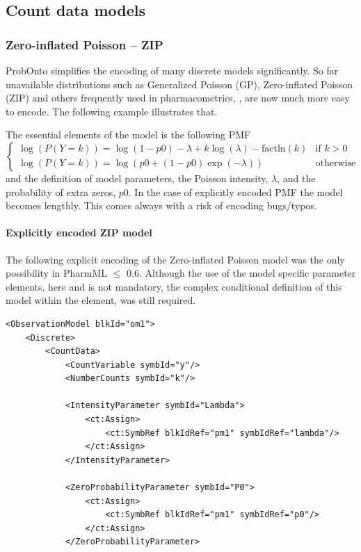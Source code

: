 {\subsection{Count data models}

\subsubsection{Zero-inflated Poisson -- ZIP}
ProbOnto simplifies the encoding of many discrete models significantly. 
So far unavailable distributions such as Generalized Poisson (GP), 
Zero-inflated Poisson (ZIP) and others frequently used in pharmacometrics,
\cite{Plan:2009fk, Troconiz:2009fv}, are now much more easy to encode. The following example illustrates that.

The essential elements of the model is the following PMF
\[
\begin{cases}
  \log(P(Y=k)) = \log(1-p0) - \lambda + k\log(\lambda) - \text{factln}(k) 	& \text{if } k > 0 \\
  \log(P(Y=k)) = \log(p0 + (1-p0)\exp(-\lambda)) 					& \text{otherwise}
\end{cases}
\]
and the definition of model parameters, the Poisson intensity, $\lambda$,
and the probability of extra zeros, $p0$. In the case of explicitly encoded PMF
the model becomes lengthly. This comes always with a risk of encoding bugs/typos.  

\paragraph{Explicitly encoded ZIP model}
The following explicit encoding of the Zero-inflated Poisson model was the only 
possibility in PharmML $\leq$ 0.6. Although the use of the model specific parameter 
elements, here  and  is not 
mandatory, the complex conditional definition of this model within the  
element, was still required. 
\lstset{language=XML}
\begin{lstlisting}
<ObservationModel blkId="om1">
    <Discrete>
        <CountData>
            <CountVariable symbId="y"/>
            <NumberCounts symbId="k"/>
            
            <IntensityParameter symbId="Lambda">
                <ct:Assign>
                    <ct:SymbRef blkIdRef="pm1" symbIdRef="lambda"/>
                </ct:Assign>
            </IntensityParameter>
            
            <ZeroProbabilityParameter symbId="P0">
                <ct:Assign>
                    <ct:SymbRef blkIdRef="pm1" symbIdRef="p0"/>
                </ct:Assign>
            </ZeroProbabilityParameter>
            

\end{lstlisting}}
